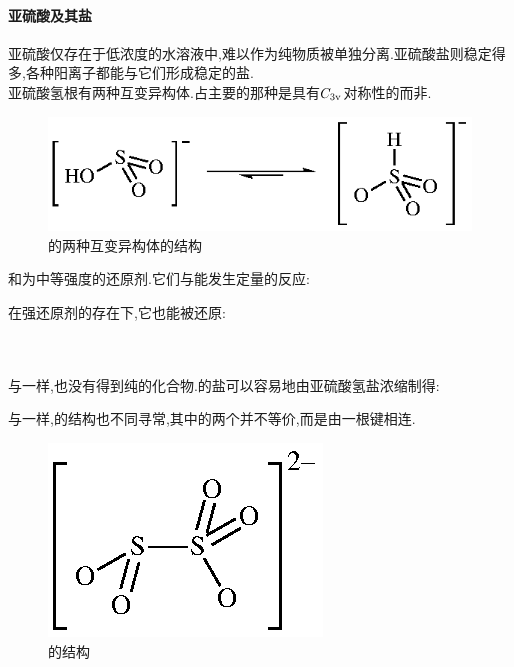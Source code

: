\documentclass{ctexart}
\begin{document}
\paragraph{亚硫酸及其盐}
亚硫酸仅存在于低浓度的水溶液中,难以作为纯物质被单独分离.亚硫酸盐则稳定得多,各种阳离子都能与它们形成稳定的盐.\\
\indent 亚硫酸氢根有两种互变异构体.占主要的那种是具有$C_{3\text v}$对称性的而非.
\begin{figure}[H]
    \centering\includegraphics{picture/HSO3-.eps}
    \caption{的两种互变异构体的结构}
\end{figure}
\indent {}和为中等强度的还原剂.它们与能发生定量的反应:
\begin{center}
\end{center}
在强还原剂的存在下,它也能被还原:
\begin{center}
    \\
\end{center}
\paragraph{}
与一样,也没有得到纯的化合物.的盐可以容易地由亚硫酸氢盐浓缩制得:
\begin{center}
\end{center}
与一样,的结构也不同寻常,其中的两个并不等价,而是由一根键相连.
\begin{figure}[H]
    \centering\includegraphics{picture/S2O52-.eps}
    \caption{的结构}
\end{figure}
\end{document}
